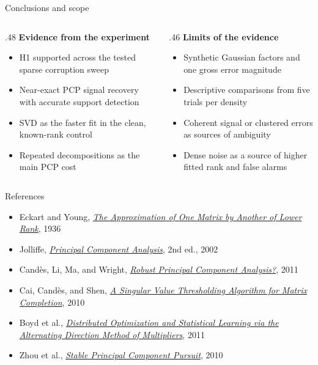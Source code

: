 \documentclass[aspectratio=1610,11pt]{beamer}
\newcommand{\heading}[1]{\textcolor{accent}{\textbf{#1}}\par\smallskip}
\newcommand{\bullets}{\begin{itemize}\setlength{\itemsep}{2.6mm}}
\newcommand{\closeitems}{\end{itemize}}
\begin{document}
\begin{frame}[t]{Conclusions and scope}
  \begin{columns}[T,onlytextwidth]
    \begin{column}{.48\textwidth}
      \heading{Evidence from the experiment}
      \bullets
        \item H1 supported across the tested sparse corruption sweep
        \item Near-exact PCP signal recovery with accurate support detection
        \item SVD as the faster fit in the clean, known-rank control
        \item Repeated decompositions as the main PCP cost
      \closeitems
    \end{column}
    \begin{column}{.46\textwidth}
      \heading{Limits of the evidence}
      \bullets
        \item Synthetic Gaussian factors and one gross error magnitude
        \item Descriptive comparisons from five trials per density
        \item Coherent signal or clustered errors as sources of ambiguity
        \item Dense noise as a source of higher fitted rank and false alarms
      \closeitems
    \end{column}
  \end{columns}
\end{frame}

\begin{frame}[t]{References}
  \small
  \begin{itemize}
    \setlength{\itemsep}{3.5mm}
    \item[{[1]}] Eckart and Young, \href{https://doi.org/10.1007/BF02288367}{\emph{The Approximation of One Matrix by Another of Lower Rank}}, 1936
    \item[{[2]}] Jolliffe, \href{https://doi.org/10.1007/b98835}{\emph{Principal Component Analysis}}, 2nd ed., 2002
    \item[{[3]}] Cand\`es, Li, Ma, and Wright, \href{https://doi.org/10.1145/1970392.1970395}{\emph{Robust Principal Component Analysis?}}, 2011
    \item[{[4]}] Cai, Cand\`es, and Shen, \href{https://doi.org/10.1137/080738970}{\emph{A Singular Value Thresholding Algorithm for Matrix Completion}}, 2010
    \item[{[5]}] Boyd et al., \href{https://doi.org/10.1561/2200000016}{\emph{Distributed Optimization and Statistical Learning via the Alternating Direction Method of Multipliers}}, 2011
    \item[{[6]}] Zhou et al., \href{https://doi.org/10.1109/ISIT.2010.5513535}{\emph{Stable Principal Component Pursuit}}, 2010
  \end{itemize}
\end{frame}
\end{document}
